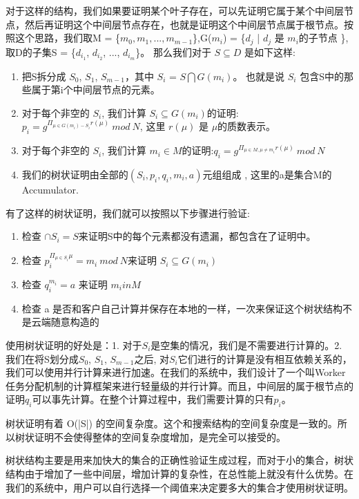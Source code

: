 对于这样的结构，我们如果要证明某个叶子存在，可以先证明它属于某个中间层节点，然后再证明这个中间层节点存在，也就是证明这个中间层节点属于根节点。按照这个思路，我们取M = \{$m_0, m_1, ..., m_{m-1}$\},G($m_i$) = \{$d_j$ | $d_j$ 是 $m_i$的子节点 \}, 取D的子集S = \{$d_{i_1}$, $d_{i_2}$, ..., $d_{i_m}$\}。 那么我们对于 $S \subseteq D$ 是如下这样:
\begin{enumerate}
  \item 把S拆分成 $S_0$, $S_1$, $S_{m-1}$，其中 $S_i$ = $S \bigcap G(m_i)$。 也就是说 $S_i$ 包含S中的那些属于第i个中间层节点的元素。
  \item 对于每个非空的 $S_i$, 我们计算 $S_i \subseteq G(m_i)$的证明: $p_i = g^{\Pi_{\mu \in G(m_i) - S_i} r(\mu)}\ mod\ N$, 这里 $r(\mu)$ 是 $\mu$的质数表示。 
  \item 对于每个非空的 $S_i$, 我们计算 $m_i \in M$的证明:$q_i =  g^{\Pi_{\mu \in M, \mu \ne m_i} r(\mu)}\ mod\ N$
  \item 我们的树状证明由全部的$(S_i, p_i, q_i, m_i, a)$元组组成 , 这里的a是集合M的Accumulator.
\end{enumerate}

有了这样的树状证明，我们就可以按照以下步骤进行验证:
\begin{enumerate}
  \item 检查 $\cap S_i = S$来证明S中的每个元素都没有遗漏，都包含在了证明中。
  \item 检查 $p_i^{\Pi_{\mu \in S_i} \mu} = m_i\ mod\ N$来证明 $S_i \subseteq G(m_i)$
  \item 检查 $q_i^{m_i} = a$ 来证明 $m_i in M$
  \item 检查 a 是否和客户自己计算并保存在本地的一样，一次来保证这个树状结构不是云端随意构造的
\end{enumerate}

使用树状证明的好处是：1. 对于$S_i$是空集的情况，我们是不需要进行计算的。2. 我们在将S划分成$S_0$, $S_1$, $S_{m-1}$之后, 对$S_i$它们进行的计算是没有相互依赖关系的，我们可以使用并行计算来进行加速。在我们的系统中，我们设计了一个叫Worker任务分配机制的计算框架来进行轻量级的并行计算。而且，中间层的属于根节点的证明$q_i$可以事先计算。在整个计算过程中，我们需要计算的只有$p_i$。

树状证明有着 O(|S|) 的空间复杂度。这个和搜索结构的空间复杂度是一致的。所以树状证明不会使得整体的空间复杂度增加，是完全可以接受的。

树状结构主要是用来加快大的集合的正确性验证生成过程，而对于小的集合，树状结构由于增加了一些中间层，增加计算的复杂性，在总性能上就没有什么优势。在我们的系统中，用户可以自行选择一个阈值来决定要多大的集合才使用树状证明。

